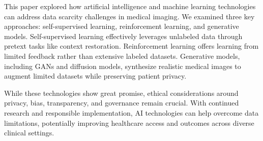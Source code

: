 \documentclass{article}
\begin{document}
This paper explored how artificial intelligence and machine learning technologies can address data scarcity challenges in medical imaging. We examined three key approaches: self-supervised learning, reinforcement learning, and generative models. Self-supervised learning effectively leverages unlabeled data through pretext tasks like context restoration. Reinforcement learning offers learning from limited feedback rather than extensive labeled datasets. Generative models, including GANs and diffusion models, synthesize realistic medical images to augment limited datasets while preserving patient privacy. 

While these technologies show great promise, ethical considerations around privacy, bias, transparency, and governance remain crucial. With continued research and responsible implementation, AI technologies can help overcome data limitations, potentially improving healthcare access and outcomes across diverse clinical settings.


\vfill\pagebreak



\end{document}
